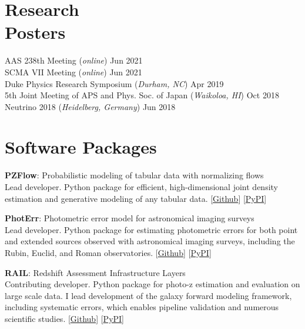 \documentclass[margin, 11pt]{res}
\begin{document}
\begin{resume}
\section{Research \\Posters}

AAS 238th Meeting (\textit{online}) \hfill Jun 2021 \\
SCMA VII Meeting (\textit{online}) \hfill Jun 2021 \\
Duke Physics Research Symposium (\textit{Durham, NC}) \hfill Apr 2019 \\
5th Joint Meeting of APS and Phys. Soc. of Japan (\textit{Waikoloa, HI}) \hfill Oct 2018 \\
Neutrino 2018 (\textit{Heidelberg, Germany}) \hfill Jun 2018 \\

\section{Software Packages}

\hangindent=2mm
\textbf{PZFlow}: Probabilistic modeling of tabular data with normalizing flows \\
Lead developer.
Python package for efficient, high-dimensional joint density estimation and generative modeling of any tabular data.
[\href{https://github.com/jfcrenshaw/pzflow}{Github}]
[\href{https://pypi.org/project/pzflow/}{PyPI}]

\hangindent=2mm
\textbf{PhotErr}: Photometric error model for astronomical imaging surveys \\
Lead developer.
Python package for estimating photometric errors for both point and extended sources observed with astronomical imaging surveys, including the Rubin, Euclid, and Roman observatories.
[\href{https://github.com/jfcrenshaw/photerr}{Github}]
[\href{https://pypi.org/project/photerr/}{PyPI}]

\hangindent=2mm
\textbf{RAIL}: Redshift Assessment Infrastructure Layers \\
Contributing developer.
Python package for photo-z estimation and evaluation on large scale data.
I lead development of the galaxy forward modeling framework, including systematic errors, which enables pipeline validation and numerous scientific studies.
[\href{https://github.com/LSSTDESC/RAIL}{Github}]
[\href{https://pypi.org/project/pz-rail/}{PyPI}]


\end{resume}
\end{document}
